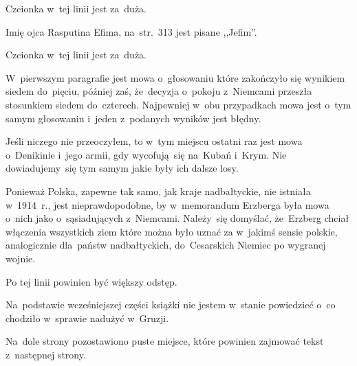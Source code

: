 \documentclass[a4paper,11pt]{article}
\begin{document}
\vspace{\spaceFour}


\start {} Czcionka w~tej linii jest za~duża.

\vspace{\spaceFour}


\start {} Imię ojca Rasputina Efima, na~str.~313 jest
pisane ,,Jefim''.

\vspace{\spaceFour}


\start {} Czcionka w~tej linii jest za~duża.

\vspace{\spaceFour}


\start {} W~pierwszym paragrafie jest mowa o~głosowaniu które
zakończyło się wynikiem siedem do~pięciu, później zaś, że~decyzja
o~pokoju z~Niemcami przeszła stosunkiem siedem do~czterech. Najpewniej
w~obu przypadkach mowa jest o~tym samym głosowaniu i~jeden z~podanych
wyników jest błędny.

\vspace{\spaceFour}


\start {} Jeśli niczego nie przeoczyłem, to w~tym miejscu
ostatni raz jest mowa o~Denikinie i~jego armii, gdy wycofują~się
na~Kubań i~Krym. Nie dowiadujemy~się tym samym jakie były ich dalsze
losy.

\vspace{\spaceFour}


\start {} Ponieważ Polska, zapewne tak samo, jak kraje
nadbałtyckie, nie istniała w~1914~r., jest nieprawdopodobne, by
w~memorandum Erzberga była mowa o~nich jako o~sąsiadujących
z~Niemcami. Należy~się domyślać, że~Erzberg chciał włączenia
wszystkich ziem które można było uznać za w~jakimś sensie polskie,
analogicznie dla~państw nadbałtyckich, do~Cesarskich Niemiec po
wygranej wojnie.

\vspace{\spaceFour}


\start {} Po tej linii powinien być większy odstęp.

\vspace{\spaceFour}


\start {} Na~podstawie wcześniejszej części książki nie
jestem w~stanie powiedzieć o~co chodziło w~sprawie nadużyć w~Gruzji.

\vspace{\spaceFour}


\start {} Na~dole strony pozostawiono puste miejsce, które
powinien zajmować tekst z~następnej strony.
\end{document}
